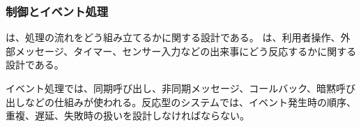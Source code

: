 \subsubsection{制御とイベント処理}

 は、処理の流れをどう組み立てるかに関する設計である。 は、利用者操作、外部メッセージ、タイマー、センサー入力などの出来事にどう反応するかに関する設計である。

イベント処理では、同期呼び出し、非同期メッセージ、コールバック、暗黙呼び出しなどの仕組みが使われる。反応型のシステムでは、イベント発生時の順序、重複、遅延、失敗時の扱いを設計しなければならない。

